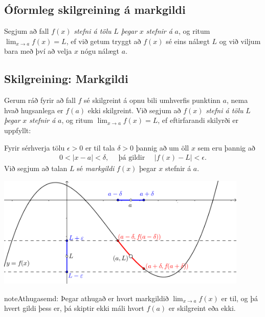\documentclass[a4paper,10pt,icelandic]{sphinxmanual}
\begin{document}
\subsection{Óformleg skilgreining á markgildi}
\label{kafli02:index-0}\label{kafli02:oformleg-skilgreining-a-markgildi}
Segjum að fall \(f(x)\) \emph{stefni á tölu} \(L\) \emph{þegar} \(x\)
\emph{stefnir á} \(a\), og ritum \(\lim_{x\rightarrow a} f(x)=L\), ef
við getum tryggt að \(f(x)\) sé eins nálægt \(L\) og við
viljum bara með því að velja \(x\) nógu nálægt \(a\).


\subsection{Skilgreining: Markgildi}
\label{kafli02:skilgreining-markgildi}
Gerum ráð fyrir að fall \(f\) sé skilgreint á opnu bili umhverfis
punktinn \(a\), nema hvað hugsanlega er \(f(a)\) ekki
skilgreint. Við segjum að \(f(x)\) \emph{stefni á tölu} \(L\) \emph{þegar}
\(x\) \emph{stefnir á} \(a\), og ritum
\(\lim_{x\rightarrow a} f(x)=L\), ef eftirfarandi skilyrði er
uppfyllt:

Fyrir sérhverja tölu \(\epsilon>0\) er til tala \(\delta>0\)
þannig að um öll \(x\) sem eru þannig að
\begin{equation*}
\begin{split}0 < |x-a| < \delta,\quad \text{ þá gildir } \quad |f(x)-L| <\epsilon.\end{split}
\end{equation*}
Við segjum að talan \(L\) sé \textit{markgildi} \(f(x)\) þegar
\(x\) stefnir á \(a\).


\begin{center}
\includegraphics[width=12cm,keepaspectratio=true]{01_markgildi.png}
\end{center}


\begin{notice}{note}{Athugasemd:}
Þegar athugað er hvort markgildið \(\lim_{x\rightarrow a} f(x)\) er
til, og þá hvert gildi þess er, þá skiptir ekki máli hvort \(f(a)\) er
skilgreint eða ekki.
\end{notice}
\end{document}
